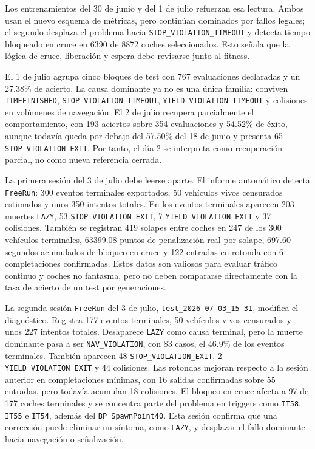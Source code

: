 Los entrenamientos del 30 de junio y del 1 de julio refuerzan esa lectura. Ambos usan el nuevo esquema de métricas, pero continúan dominados por fallos legales; el segundo desplaza el problema hacia \texttt{STOP\_VIOLATION\_TIMEOUT} y detecta tiempo bloqueado en cruce en 6390 de 8872 coches seleccionados. Esto señala que la lógica de cruce, liberación y espera debe revisarse junto al fitness.

El 1 de julio agrupa cinco bloques de test con 767 evaluaciones declaradas y un 27.38\% de acierto. La causa dominante ya no es una única familia: conviven \texttt{TIMEFINISHED}, \texttt{STOP\_VIOLATION\_TIMEOUT}, \texttt{YIELD\_VIOLATION\_TIMEOUT} y colisiones en volúmenes de navegación. El 2 de julio recupera parcialmente el comportamiento, con 193 aciertos sobre 354 evaluaciones y 54.52\% de éxito, aunque todavía queda por debajo del 57.50\% del 18 de junio y presenta 65 \texttt{STOP\_VIOLATION\_EXIT}. Por tanto, el día 2 se interpreta como recuperación parcial, no como nueva referencia cerrada.

La primera sesión del 3 de julio debe leerse aparte. El informe automático detecta \texttt{FreeRun}: 300 eventos terminales exportados, 50 vehículos vivos censurados estimados y unos 350 intentos totales. En los eventos terminales aparecen 203 muertes \texttt{LAZY}, 53 \texttt{STOP\_VIOLATION\_EXIT}, 7 \texttt{YIELD\_VIOLATION\_EXIT} y 37 colisiones. También se registran 419 solapes entre coches en 247 de los 300 vehículos terminales, 63399.08 puntos de penalización real por solape, 697.60 segundos acumulados de bloqueo en cruce y 122 entradas en rotonda con 6 completaciones confirmadas. Estos datos son valiosos para evaluar tráfico continuo y coches no fantasma, pero no deben compararse directamente con la tasa de acierto de un test por generaciones.

La segunda sesión \texttt{FreeRun} del 3 de julio, \texttt{test\_2026-07-03\_15-31}, modifica el diagnóstico. Registra 177 eventos terminales, 50 vehículos vivos censurados y unos 227 intentos totales. Desaparece \texttt{LAZY} como causa terminal, pero la muerte dominante pasa a ser \texttt{NAV\_VIOLATION}, con 83 casos, el 46.9\% de los eventos terminales. También aparecen 48 \texttt{STOP\_VIOLATION\_EXIT}, 2 \texttt{YIELD\_VIOLATION\_EXIT} y 44 colisiones. Las rotondas mejoran respecto a la sesión anterior en completaciones mínimas, con 16 salidas confirmadas sobre 55 entradas, pero todavía acumulan 18 colisiones. El bloqueo en cruce afecta a 97 de 177 coches terminales y se concentra parte del problema en triggers como \texttt{IT58}, \texttt{IT55} e \texttt{IT54}, además del \texttt{BP\_SpawnPoint40}. Esta sesión confirma que una corrección puede eliminar un síntoma, como \texttt{LAZY}, y desplazar el fallo dominante hacia navegación o señalización.

